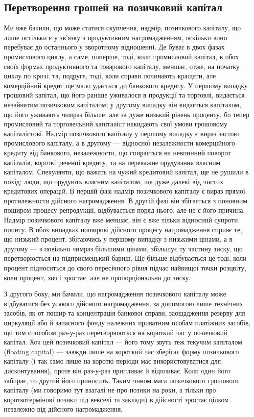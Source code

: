 
\subsection{Перетворення грошей на позичковий капітал}

Ми вже бачили, що може статися скупчення, надмір, позичкового капіталу,
що лише остільки є у зв’язку з продуктивним нагромадженням, оскільки воно
перебуває до останнього у зворотному відношенні. Де буває в двох фазах
промислового циклу, а саме, поперше, тоді, коли промисловий капітал, в обох
своїх формах продуктивного та товарового капіталу, меншає, отже, на початку
циклу по кризі; та, подруге, тоді, коли справи починають кращати,
але комерційний кредит ще мало удається до банкового кредиту. У першому
випадку грошовий капітал, що його раніше уживалося в продукції та торговлі,
видається незайнятим позичковим капіталом; у другому випадку він
видається капіталом, що його уживають чимраз більше, але за дуже низький
рівень проценту, бо тепер промисловий та торговельний капіталіст накидають
свої умови грошовому капіталістові. Надмір позичкового капіталу у першому
випадку є вираз застою промислового капіталу, а в другому — відносної
незалежности комерційного кредиту від банкового, незалежности, що спирається
на невпинний поворот капіталів, короткі реченці кредиту, та на переважне
орудування власним капіталом. Спекулянти, що важать на чужий кредитовий
капітал, ще не рушили в похід; люди, що орудують власним капіталом,
ще дуже далекі від чистих кредитових операцій. В першій фазі надмір позичкового
капіталу є вираз прямої протилежности дійсного нагромадження. В другій
фазі він збігається з поновним поширом процесу репродукції, відбувається поряд
нього, але не є його причина. Надмір позичкового капіталу вже меншає, він є
вже тільки відносний супроти попиту. В обох випадках поширові дійсного процесу
нагромадження сприяє те, що низький процент, збігаючись у першому
випадку з низькими цінами, а в другому — з повільно чимраз більшими цінами,
збільшує ту частину зиску, що перетворюється на підприємецький бариш. Ще
більше відбувається це тоді, коли процент підноситься до свого пересічного рівня
підчас найвищої точки розцвіту, коли процент, хоч і зростає, але не пропорціонально
до зиску.

З другого боку, ми бачили, що нагромадження позичкового капіталу може
відбуватися без усякого дійсного нагромадження, за допомогою лише технічних
засобів, як от пошир та концентрація банкової справи, заощадження резерву
для циркуляції або й запасного фонду належних приватним особам платіжних засобів,
що тим способом раз-у-раз перетворюються на короткий час у позичковий
капітал. Хоч цей позичковий капітал — його тому звуть теж текучим капіталом
(floating capital) — завжди лише на короткий час зберігає форму позичкового капіталу
(і так само лише на короткі періоди має використовуватися для дисконтування),
проте він раз-у-раз припливає й відпливає. Коли один його забирає, то другий його
приносить. Таким чином маса позичкового грошового капіталу (ми говоримо тут
взагалі не про позики на роки, а тільки про короткотермінові позики під векселі
та заклади) в дійсності зростає цілком незалежно від дійсного нагромадження.

